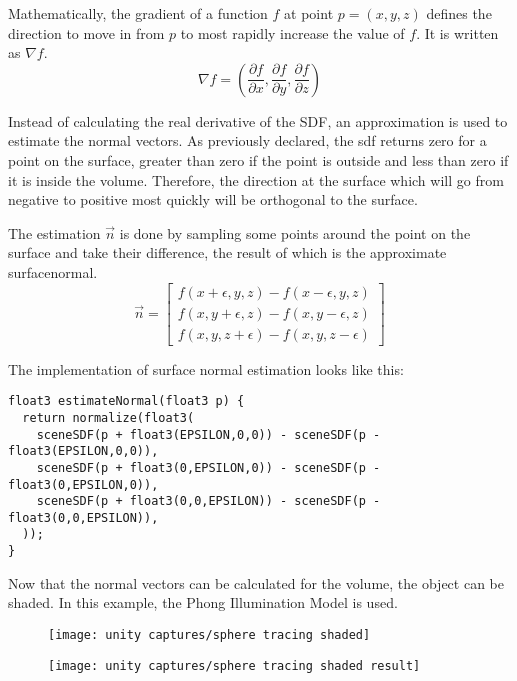 \noindent
Mathematically, the \gls{gradient} of a function $f$ at point $p=(x,y,z)$ defines the direction to move in from $p$ to most rapidly increase the value of $f$. 
It is written as $\nabla f$.
$$
\nabla f = \left( \frac{\partial f}{\partial x}, \frac{\partial f}{\partial y}, \frac{\partial f}{\partial z} \right)
$$

\noindent
Instead of calculating the real derivative of the SDF, an approximation is used to estimate the normal vectors.
As previously declared, the \gls{sdf} returns zero for a point on the surface, greater than zero if the point is outside and less than zero if it is inside the volume. 
Therefore, the direction at the surface which will go from negative to positive most quickly will be orthogonal to the surface.
\\
\begin{minipage}{\linewidth}
The estimation $\overrightarrow{n}$ is done by sampling some points around the point on the surface and take their difference, the result of which is the approximate \gls{surfacenormal}.
$$
\overrightarrow{n} = 
\left[
    \begin{matrix}
        f(x + \epsilon, y, z) - f(x - \epsilon, y, z) \\
        f(x, y + \epsilon, z) - f(x, y - \epsilon, z) \\
        f(x, y, z + \epsilon) - f(x, y, z - \epsilon)
       \end{matrix}
\right]
$$

\noindent
The implementation of surface normal estimation looks like this:

\begin{lstlisting}[language=HLSL, caption=Implementation of surface normal estimation., label=lst:shader:surfacenormal]
float3 estimateNormal(float3 p) {
  return normalize(float3(
    sceneSDF(p + float3(EPSILON,0,0)) - sceneSDF(p - float3(EPSILON,0,0)),
    sceneSDF(p + float3(0,EPSILON,0)) - sceneSDF(p - float3(0,EPSILON,0)),
    sceneSDF(p + float3(0,0,EPSILON)) - sceneSDF(p - float3(0,0,EPSILON)),
  ));
}
\end{lstlisting}
\end{minipage}

\noindent
Now that the normal vectors can be calculated for the volume, the object can be shaded. In this example, the Phong Illumination Model\cite{online:phong} is used. 

\begin{figure}[H]
    \centering
        \begin{minipage}{0.47\linewidth}
            \texttt{[image: unity captures/sphere tracing shaded]}
            \label{img:captures:spheretracing}
        \end{minipage}
    \hfill
        \begin{minipage}{0.47\linewidth}
            \texttt{[image: unity captures/sphere tracing shaded result]}
            \label{img:captures:spheretracing_rendered}
        \end{minipage}
\end{figure}

